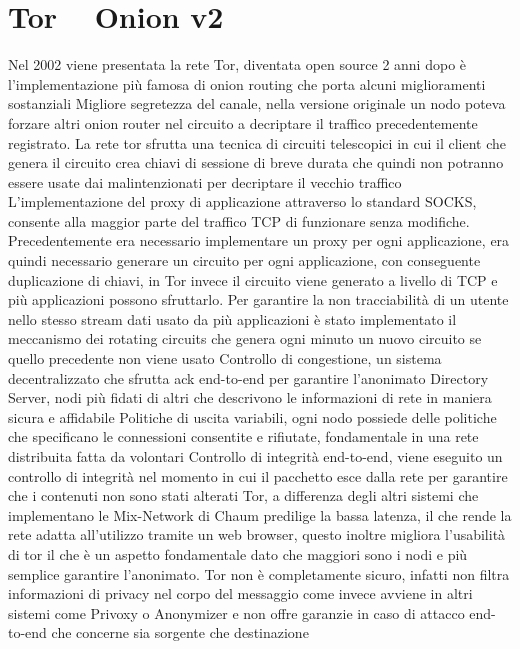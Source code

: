 \section{Tor ~ Onion v2}
Nel 2002 viene presentata la rete Tor, diventata open source 2 anni dopo è l’implementazione più famosa di onion routing che porta alcuni miglioramenti sostanziali
Migliore segretezza del canale, nella versione originale un nodo poteva forzare altri onion router nel circuito a decriptare il traffico precedentemente registrato. La rete tor sfrutta una tecnica di circuiti telescopici in cui il client che genera il circuito crea chiavi di sessione di breve durata che quindi non potranno essere usate dai malintenzionati per decriptare il vecchio traffico
L’implementazione del proxy di applicazione attraverso lo standard SOCKS, consente alla maggior parte del traffico TCP di funzionare senza modifiche. Precedentemente era necessario implementare un proxy per ogni applicazione, era quindi necessario generare un circuito per ogni applicazione, con conseguente duplicazione di chiavi, in Tor invece il circuito viene generato a livello di TCP e più applicazioni possono sfruttarlo. Per garantire la non tracciabilità di un utente nello stesso stream dati usato da più applicazioni è stato implementato il meccanismo dei rotating circuits che genera ogni minuto un nuovo circuito se quello precedente non viene usato
Controllo di congestione, un sistema decentralizzato che sfrutta ack end-to-end per garantire l’anonimato
Directory Server, nodi più fidati di altri che descrivono le informazioni di rete in maniera sicura e affidabile
Politiche di uscita variabili, ogni nodo possiede delle politiche che specificano le connessioni consentite e rifiutate, fondamentale in una rete distribuita fatta da volontari
Controllo di integrità end-to-end, viene eseguito un controllo di integrità nel momento in cui il pacchetto esce dalla rete per garantire che i contenuti non sono stati alterati
Tor, a differenza degli altri sistemi che implementano le Mix-Network di Chaum predilige la bassa latenza, il che rende la rete adatta all’utilizzo tramite un web browser, questo inoltre migliora l’usabilità di tor il che è un aspetto fondamentale dato che maggiori sono i nodi e più semplice garantire l’anonimato.
Tor non è completamente sicuro, infatti non filtra informazioni di privacy nel corpo del messaggio come invece avviene in altri sistemi come Privoxy o Anonymizer e non offre garanzie in caso di attacco end-to-end che concerne sia sorgente che destinazione 